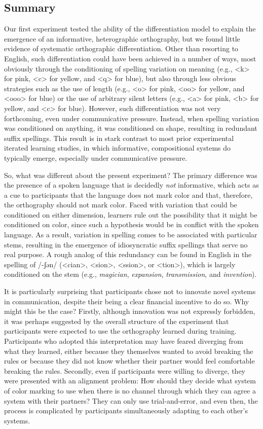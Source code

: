 \documentclass[doc,biblatex]{apa7}
\begin{document}
\subsection{Summary}

Our first experiment tested the ability of the differentiation model to explain the emergence of an informative, heterographic orthography, but we found little evidence of systematic orthographic differentiation. Other than resorting to English, such differentiation could have been achieved in a number of ways, most obviously through the conditioning of spelling variation on meaning (e.g., <k> for pink, <c> for yellow, and <q> for blue), but also through less obvious strategies such as the use of length (e.g., <o> for pink, <oo> for yellow, and <ooo> for blue) or the use of arbitrary silent letters (e.g., <a> for pink, <b> for yellow, and <c> for blue). However, such differentiation was not very forthcoming, even under communicative pressure. Instead, when spelling variation was conditioned on anything, it was conditioned on shape, resulting in redundant suffix spellings. This result is in stark contrast to most prior experimental iterated learning studies, in which informative, compositional systems do typically emerge, especially under communicative pressure.

So, what was different about the present experiment? The primary difference was the presence of a spoken language that is decidedly \textit{not} informative, which acts as a cue to participants that the language does not mark color and that, therefore, the orthography should not mark color. Faced with variation that could be conditioned on either dimension, learners rule out the possibility that it might be conditioned on color, since such a hypothesis would be in conflict with the spoken language. As a result, variation in spelling comes to be associated with particular stems, resulting in the emergence of idiosyncratic suffix spellings that serve no real purpose. A rough analog of this redundancy can be found in English in the spelling of /-ʃən/ (<cian>, <sion>, <ssion>, or <tion>), which is largely conditioned on the stem (e.g., \textit{magician}, \textit{expansion}, \textit{transmission}, and \textit{invention}).

It is particularly surprising that participants chose not to innovate novel systems in communication, despite their being a clear financial incentive to do so. Why might this be the case? Firstly, although innovation was not expressly forbidden, it was perhaps suggested by the overall structure of the experiment that participants were expected to use the orthography learned during training. Participants who adopted this interpretation may have feared diverging from what they learned, either because they themselves wanted to avoid breaking the rules or because they did not know whether their partner would feel comfortable breaking the rules. Secondly, even if participants were willing to diverge, they were presented with an alignment problem: How should they decide what system of color marking to use when there is no channel through which they can agree a system with their partners? They can only use trial-and-error, and even then, the process is complicated by participants simultaneously adapting to each other's systems.
\end{document}
